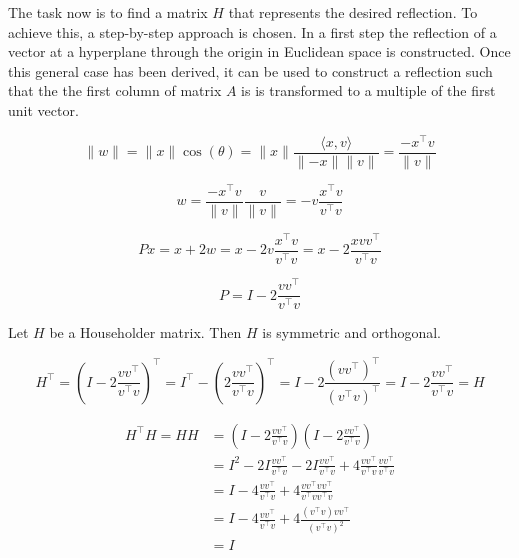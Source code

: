 The task now is to find a matrix $H$ that represents the desired reflection. To achieve this, a step-by-step approach is chosen. In a first step the reflection of a vector at a hyperplane through the origin in Euclidean space is constructed. Once this general case has been derived, it can be used to construct a reflection such that the the first column of matrix $A$ is is transformed to a multiple of the first unit vector.

\begin{equation*}
	\lVert w \rVert 
	= \lVert x \rVert \cos(\theta) 
	= \lVert x \rVert \frac{\langle x, v \rangle}{\lVert -x \rVert  \lVert v \rVert} 
	= \frac{-x^\top v}{\lVert v \rVert}
\end{equation*}

\begin{equation*}
	w  
	= \frac{-x^\top v}{\lVert v \rVert} \frac{v}{\lVert v \rVert}
	= -v \frac{x^\top v}{v^\top v}
\end{equation*}

\begin{equation*}
	Px   
	= x + 2w
	= x - 2v \frac{x^\top v}{v^\top v}
	= x - 2 \frac{x v v^\top}{v^\top v}
\end{equation*}

\begin{equation*}
P = I - 2 \frac{v v^\top}{v^\top v}
\end{equation*}

\begin{remark}
	Let $H$ be a Householder matrix. Then $H$ is symmetric and orthogonal. 
	
	\begin{equation*}
		H^\top 	= (I - 2 \frac{v v^\top}{v^\top v})^\top 
				= I^\top - \left( 2 \frac{v v^\top}{v^\top v} \right)^\top 
				= I - 2 \frac{\left( v v^\top \right)^\top}{\left( v^\top v \right)^\top} 
				= I - 2 \frac{v v^\top}{v^\top v} = H	
	\end{equation*}
	
	\begin{align*}
		H^\top H = H H 	
		& = (I - 2 \frac{v v^\top}{v^\top v}) (I - 2 \frac{v v^\top}{v^\top v}) \\
		& = I^2 - 2I \frac{v v^\top}{v^\top v} - 2I \frac{v v^\top}{v^\top v} + 4 \frac{v v^\top}{v^\top v} \frac{v v^\top}{v^\top v} \\
		& = I - 4 \frac{v v^\top}{v^\top v} + 4 \frac{v v^\top v v^\top}{v^\top v v^\top v} \\
		& = I - 4 \frac{v v^\top}{v^\top v} + 4 \frac{(v^\top v) v v^\top}{(v^\top v)^2} \\
		& = I
	\end{align*}
\end{remark}